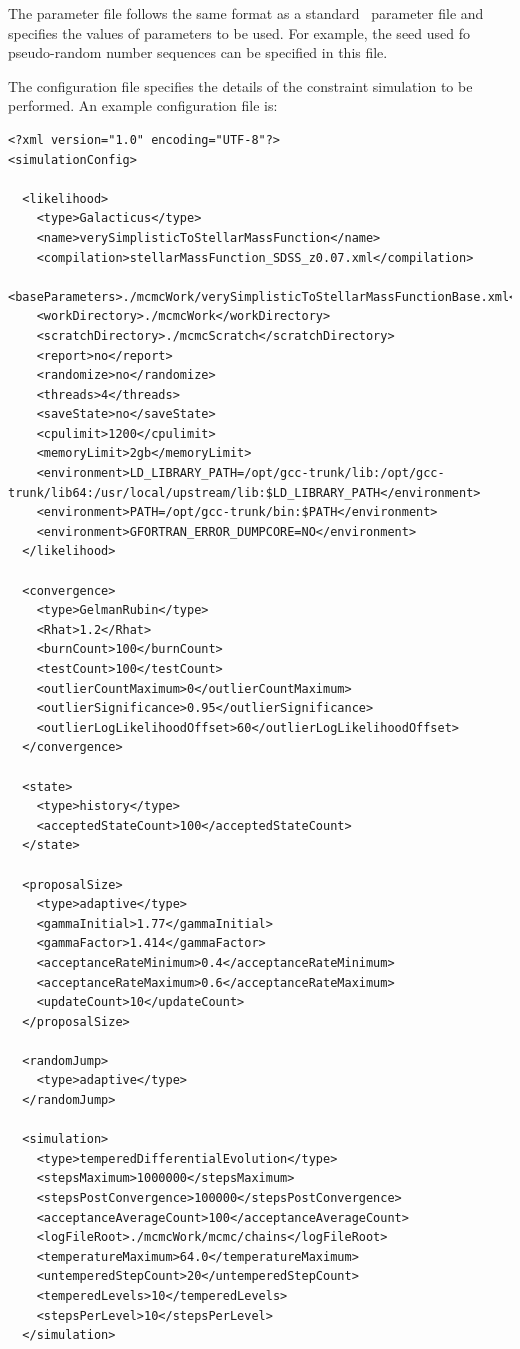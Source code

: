 The parameter file follows the same format as a standard \glc\ parameter file and specifies the values of parameters to be used. For example, the seed used fo pseudo-random number sequences can be specified in this file. 

The configuration file specifies the details of the constraint simulation to be performed. An example configuration file is:
\begin{verbatim}
<?xml version="1.0" encoding="UTF-8"?>
<simulationConfig>

  <likelihood>
    <type>Galacticus</type>
    <name>verySimplisticToStellarMassFunction</name>
    <compilation>stellarMassFunction_SDSS_z0.07.xml</compilation>
    <baseParameters>./mcmcWork/verySimplisticToStellarMassFunctionBase.xml</baseParameters>
    <workDirectory>./mcmcWork</workDirectory>
    <scratchDirectory>./mcmcScratch</scratchDirectory>
    <report>no</report>
    <randomize>no</randomize>
    <threads>4</threads>
    <saveState>no</saveState>
    <cpulimit>1200</cpulimit>
    <memoryLimit>2gb</memoryLimit>
    <environment>LD_LIBRARY_PATH=/opt/gcc-trunk/lib:/opt/gcc-trunk/lib64:/usr/local/upstream/lib:$LD_LIBRARY_PATH</environment>
    <environment>PATH=/opt/gcc-trunk/bin:$PATH</environment>
    <environment>GFORTRAN_ERROR_DUMPCORE=NO</environment>
  </likelihood>

  <convergence>
    <type>GelmanRubin</type>
    <Rhat>1.2</Rhat>
    <burnCount>100</burnCount>
    <testCount>100</testCount>
    <outlierCountMaximum>0</outlierCountMaximum>
    <outlierSignificance>0.95</outlierSignificance>
    <outlierLogLikelihoodOffset>60</outlierLogLikelihoodOffset>
  </convergence>
  
  <state>
    <type>history</type>
    <acceptedStateCount>100</acceptedStateCount>
  </state>
  
  <proposalSize>
    <type>adaptive</type>
    <gammaInitial>1.77</gammaInitial>
    <gammaFactor>1.414</gammaFactor>
    <acceptanceRateMinimum>0.4</acceptanceRateMinimum>
    <acceptanceRateMaximum>0.6</acceptanceRateMaximum>
    <updateCount>10</updateCount>
  </proposalSize>
  
  <randomJump>
    <type>adaptive</type>
  </randomJump>
  
  <simulation>
    <type>temperedDifferentialEvolution</type>
    <stepsMaximum>1000000</stepsMaximum>
    <stepsPostConvergence>100000</stepsPostConvergence>
    <acceptanceAverageCount>100</acceptanceAverageCount>
    <logFileRoot>./mcmcWork/mcmc/chains</logFileRoot>
    <temperatureMaximum>64.0</temperatureMaximum>
    <untemperedStepCount>20</untemperedStepCount>
    <temperedLevels>10</temperedLevels>
    <stepsPerLevel>10</stepsPerLevel>
  </simulation>


\end{verbatim}
